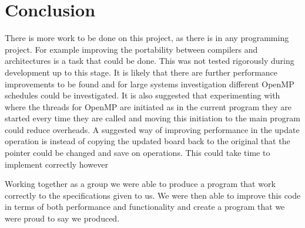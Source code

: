 \documentclass[12pt]{article}    %
\numberwithin{equation}{section}
\begin{document}
\section{Conclusion}
There is more work to be done on this project, as there is in any programming project.
For example improving the portability between compilers and architectures is a task that could be done.
This was not tested rigorously during development up to this stage.
It is likely that there are further performance improvements to be found and for large systems investigation different OpenMP schedules could be investigated.
It is also suggested that experimenting with where the threads for OpenMP are initiated as in the current program they are started every time they are called and moving this initiation to the main program could reduce overheads.
A suggested way of improving performance in the update operation is instead of copying the updated board back to the original that the pointer could be changed and save on operations.
This could take time to implement correctly however

Working together as a group we were able to produce a program that work correctly to the specifications given to us.
We were then able to improve this code in terms of both performance and functionality and create a program that we were proud to say we produced.
\end{document}
